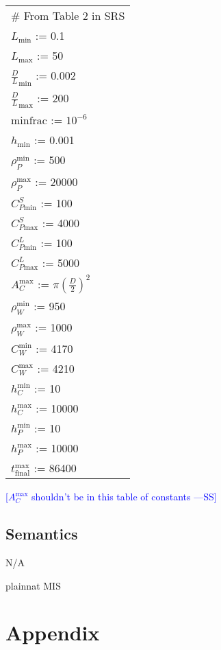 \documentclass[12pt, titlepage]{article}
\newcommand{\authornote}[3]{\textcolor{#1}{[#3 ---#2]}}
\newcommand{\authornote}[3]{}
\newcommand{\wss}[1]{\authornote{blue}{SS}{#1}}
\begin{document}
\renewcommand{\arraystretch}{1.2}
\begin{longtable*}[l]{l} 
\# From Table 2 in SRS\\
  $L_\text{min}$ := 0.1\\
  $L_\text{max}$ := 50\\
  ${\frac{D}{L}}_\text{min}$ := 0.002 \\
  ${\frac{D}{L}}_\text{max}$ := 200 \\
  $\text{minfrac} $ := $10^{-6}$\\
  $h_\text{min}$ := 0.001 \\
  $\rho_P^{\text{min}}$ := 500\\
  $\rho_P^{\text{max}}$ := 20000\\
  $C_{P\text{min}}^S$ := 100 \\
  $C_{P\text{max}}^S$ := 4000\\
  $C_{P\text{min}}^L$ := 100 \\
  $C_{P\text{max}}^L$ := 5000\\
  $A_C^{\text{max}}$ := $\pi(\frac{D}{2})^2$\\
  $\rho_W^{\text{min}}$ := 950\\
  $\rho_W^{\text{max}}$ := 1000\\
  $C_W^{\text{min}}$ := 4170\\
  $C_W^{\text{max}}$ := 4210\\
  $h_C^{\text{min}}$ := 10\\
  $h_C^{\text{max}}$ := 10000\\
  $h_P^{\text{min}}$ := 10\\
  $h_P^{\text{max}}$ := 10000\\
  $t_{\text{final}}^{\text{max}}$ := 86400\\
\end{longtable*}

\wss{$A_C^{\text{max}}$ shouldn't be in this table of constants}

\subsection{Semantics}

N/A

\newpage

 {plainnat}
 {MIS}

\newpage

\section{Appendix} \label{Appendix}
\end{document}
